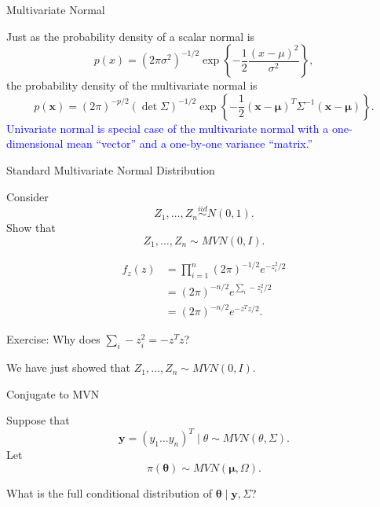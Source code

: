 \documentclass[
  ignorenonframetext,
]{beamer}
\newcommand{\btheta}{{\bm\theta}}
\newcommand{\bmu}{\bm{\mu}}
\begin{document}
\begin{frame}{Multivariate Normal}
\protect\hypertarget{multivariate-normal}{}

Just as the probability density of a scalar normal is \begin{equation}
p(x) = {\left(2\pi\sigma^2\right)}^{-1/2}\exp{\left\{ -\frac{1}{2} \frac{(x-\mu)^2}{\sigma^2}\right\}},
\end{equation} the probability density of the multivariate normal is
\begin{equation}
p(\bm{x}) = {\left(2\pi\right)}^{-p/2}(\det{\Sigma})^{-1/2} \exp{\left\{-\frac{1}{2} (\bm{x}-\bmu)^T\Sigma^{-1} (\bm{x} - \bmu)\right\}}.
\end{equation}
\textcolor{blue}{Univariate normal is special case of the multivariate normal with a one-dimensional mean ``vector'' and a one-by-one variance ``matrix.''}

\end{frame}

\begin{frame}{Standard Multivariate Normal Distribution}
\protect\hypertarget{standard-multivariate-normal-distribution}{}

Consider \[Z_1, \ldots, Z_n \stackrel{iid}{\sim} N(0,1).\] Show that
\[Z_1,\ldots,Z_n \sim MVN(0,I).\]

\begin{align}
f_z(z) &= \prod_{i=1}^n (2\pi)^{-1/2} e^{-z_i^2/2}\\
& = (2\pi)^{-n/2} e^{\sum_i-z_i^2/2}\\
& = (2\pi)^{-n/2} e^{-z^Tz/2}.
\end{align}

Exercise: Why does \(\sum_i-z_i^2 = -z^Tz\)?

We have just showed that \(Z_1,\ldots,Z_n \sim MVN(0,I).\)

\end{frame}

\begin{frame}{Conjugate to MVN}
\protect\hypertarget{conjugate-to-mvn}{}

Suppose that
\[\bm{y} = (y_1 \ldots y_n)^T \mid \theta \sim MVN(\theta, \Sigma). \]
Let \[\pi(\btheta) \sim MVN(\bmu, \Omega). \]

What is the full conditional distribution of
\(\btheta \mid \bm{y}, \Sigma\)?

\end{frame}
\end{document}
